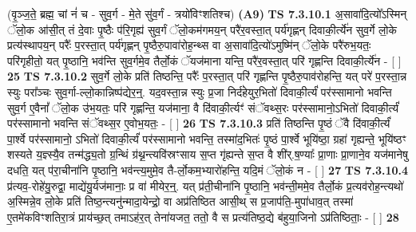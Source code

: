 \documentclass[17pt]{extarticle}
\begin{document}
                  \newline
                      (वृ॒ञ्ज॒ते॒ ब्रह्म॒ चां नं॑ च - सुव॒र्ग - मे॒ते सु॑व॒र्गं - त्रयो॑विꣳशतिश्च)  \textbf{(A9)} \newline \newline
                                        \textbf{ TS 7.3.10.1} \newline
                  अ॒सावा॑दि॒त्यो᳚ऽस्मिन् ॅलो॒क आ॑सी॒त् तं दे॒वाः पृ॒ष्ठैः प॑रि॒गृह्य॑ सुव॒र्गं ॅलो॒कम॑गमय॒न् परै॑र॒वस्ता॒त् पर्य॑गृह्णन् दिवाकी॒र्त्ये॑न सुव॒र्गे लो॒के प्रत्य॑स्थापय॒न् परैः᳚ प॒रस्ता॒त् पर्य॑गृह्णन् पृ॒ष्ठैरु॒पावा॑रोह॒न्थ्स वा अ॒सावा॑दि॒त्यो॑ऽमुष्मि॑न् ॅलो॒के परै॑रुभ॒यतः॒ परि॑गृहीतो॒ यत् पृ॒ष्ठानि॒ भव॑न्ति सुव॒र्गमे॒व तैर्लो॒कं ॅयज॑माना यन्ति॒ परै॑र॒वस्ता॒त् परि॑ गृह्णन्ति दिवाकी॒र्त्ये॑न - [  ] \textbf{  25} \newline
                  \newline
                                \textbf{ TS 7.3.10.2} \newline
                  सुव॒र्गे लो॒के प्रति॑ तिष्ठन्ति॒ परैः᳚ प॒रस्ता॒त् परि॑ गृह्णन्ति पृ॒ष्ठैरु॒पाव॑रोहन्ति॒ यत् परे॑ प॒रस्ता॒न्न स्युः परा᳚ञ्चः सुव॒र्गा-ल्लो॒कान्निष्प॑द्येर॒न्॒. यद॒वस्ता॒न्न स्युः प्र॒जा निर्द॑हेयुर॒भितो॑ दिवाकी॒र्त्यं॑ पर॑स्सामानो भवन्ति सुव॒र्ग ए॒वैनां᳚ ॅलो॒क उ॑भ॒यतः॒ परि॑ गृह्णन्ति॒ यज॑माना॒ वै दि॑वाकी॒र्त्यꣳ॑ संॅवथ्स॒रः पर॑स्सामानो॒ऽभितो॑ दिवाकी॒र्त्यं॑ पर॑स्सामानो भवन्ति संॅवथ्स॒र ए॒वोभ॒यतः॒ - [  ] \textbf{  26} \newline
                  \newline
                                \textbf{ TS 7.3.10.3} \newline
                  प्रति॑ तिष्ठन्ति पृ॒ष्ठं ॅवै दि॑वाकी॒र्त्यं॑ पा॒र्श्वे पर॑स्सामानो॒ ऽभितो॑ दिवाकी॒र्त्यं॑ पर॑स्सामानो भवन्ति॒ तस्मा॑द॒भितः॑ पृ॒ष्ठं पा॒र्श्वे भूयि॑ष्ठा॒ ग्रहा॑ गृह्यन्ते॒ भूयि॑ष्ठꣳ शस्यते य॒ज्ञ्स्यै॒व तन्म॑द्ध्य॒तो ग्र॒न्थिं ग्र॑थ्न॒न्त्यवि॑स्रꣳसाय स॒प्त गृ॑ह्यन्ते स॒प्त वै शी॑र्.ष॒ण्याः᳚ प्रा॒णाः प्रा॒णाने॒व यज॑मानेषु दधति॒ यत् प॑रा॒चीना॑नि पृ॒ष्ठानि॒ भव॑न्त्य॒मुमे॒व तै-र्लो॒कम॒भ्यारो॑हन्ति॒ यदि॒मं ॅलो॒कं न - [  ] \textbf{  27} \newline
                  \newline
                                \textbf{ TS 7.3.10.4} \newline
                  प्र॑त्यव॒-रोहे॑यु॒रुद्वा॒ माद्ये॑यु॒र्यज॑मानाः॒ प्र वा॑ मीयेर॒न्॒. यत् प्र॑ती॒चीना॑नि पृ॒ष्ठानि॒ भव॑न्ती॒ममे॒व तैर्लो॒कं प्र॒त्यव॑रोह॒न्त्यथो॑ अ॒स्मिन्ने॒व लो॒के प्रति॑ तिष्ठ॒न्त्यनु॑न्मादा॒येन्द्रो॒ वा अप्र॑तिष्ठित आसी॒थ् स प्र॒जाप॑ति॒-मुपा॑धाव॒त् तस्मा॑ ए॒तमे॑कविꣳशतिरा॒त्रं प्राय॑च्छ॒त् तमाऽह॑र॒त् तेना॑यजत॒ ततो॒ वै स प्रत्य॑तिष्ठ॒द्ये ब॑हुया॒जिनो ऽप्र॑तिष्ठिताः॒ - [  ] \textbf{  28} \newline
\end{document}
